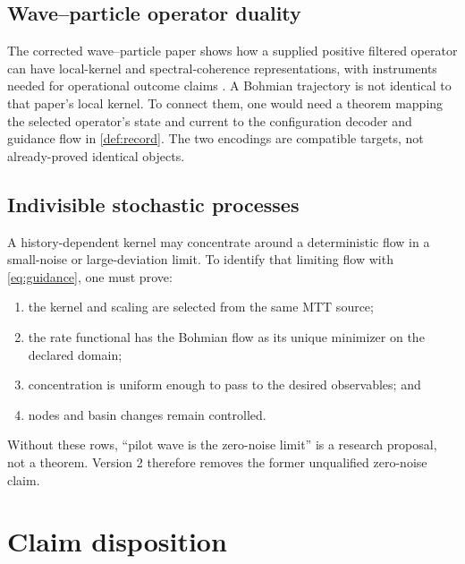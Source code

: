 \documentclass[11pt]{article}
\theoremstyle{definition}
\theoremstyle{remark}
\let\MTToriginalitem\item
\renewcommand{\item}{\par\MTToriginalitem}
\begin{document}
\subsection{Wave--particle operator duality}

The corrected wave--particle paper shows how a supplied positive filtered
operator can have local-kernel and spectral-coherence representations, with
instruments needed for operational outcome claims
\cite{MTTWaveParticle2026}.  A Bohmian trajectory is not identical to that
paper's local kernel.  To connect them, one would need a theorem mapping the
selected operator's state and current to the configuration decoder and
guidance flow in \cref{def:record}.  The two encodings are compatible
targets, not already-proved identical objects.

\subsection{Indivisible stochastic processes}

A history-dependent kernel may concentrate around a deterministic flow in a
small-noise or large-deviation limit.  To identify that limiting flow with
\cref{eq:guidance}, one must prove:
\begin{enumerate}[leftmargin=2em]
\item the kernel and scaling are selected from the same MTT source;
\item the rate functional has the Bohmian flow as its unique minimizer on
      the declared domain;
\item concentration is uniform enough to pass to the desired observables;
      and
\item nodes and basin changes remain controlled.
\end{enumerate}
Without these rows, ``pilot wave is the zero-noise limit'' is a research
proposal, not a theorem.  Version 2 therefore removes the former
unqualified zero-noise claim.

\section{Claim disposition}
\label{sec:claims}
\end{document}
